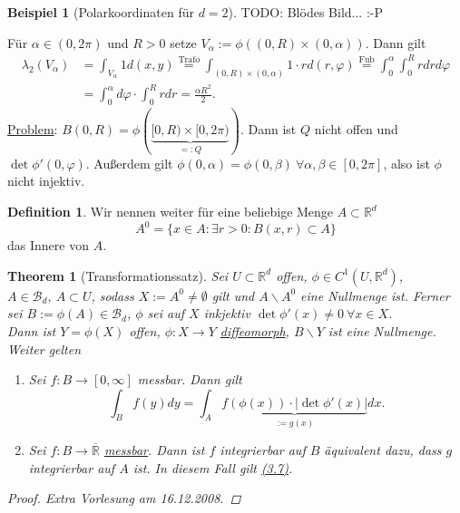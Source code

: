 \documentclass[a4paper]{report}
\newcommand{\R}{\mathbb{R}}
\newcommand{\Rq}{\overline{\R}}
\newcommand{\Borel}{\mathcal{B}}
\newcommand{\Bd}{\Borel_d}
\newcommand{\jlabel}[1]{\label{j_#1}}
\newcommand{\jhyperref}[2]{\hyperref[j_#1]{#2}}
\newcommand{\jlink}[1]{\jhyperref{#1}{#1}}
\newcommand{\jabb}[3]{ #1: #2 \rightarrow #3 }
\newcommand{\jshortlinkFubini}{\jhyperref{Fubini}{\text{Fub}}}
\newcommand{\jspace}{\vspace{8pt}}
\theoremstyle{plain}
\newtheorem{thm}{Theorem}[chapter]
\theoremstyle{definition}
\newtheorem*{defn*}{Definition}
\newtheorem*{expl*}{Beispiel}
\begin{document}
{{{{\begin{expl*}[Polarkoordinaten für $d=2$]
    \jspace
    
    TODO: Blödes Bild... :-P
    
    \jspace
    
    Für $\alpha \in (0, 2\pi)$ und $R>0$ setze $V_\alpha:= \phi((0,R)\times (0, \alpha))$. Dann gilt
    \begin{displaymath}
        \begin{split}
            \lambda_2(V_\alpha) &= \int_{V_\alpha} 1 d(x,y) \overset{\text{Trafo}}{=} \int_{(0,R)\times(0,\alpha)} 1\cdot r d(r,\varphi) \overset{\jshortlinkFubini}{=} \int_0^\alpha \int_0^R r dr d\varphi\\
            &= \int_0^\alpha d\varphi \cdot \int_0^R r dr = \frac{\alpha R^2}{2}.
        \end{split}
    \end{displaymath}
    \uline{Problem}: $B(0,R) = \phi(\underbrace{[0,R)\times [0,2\pi)}_{=: Q})$. Dann ist $Q$ nicht offen und $\det \phi'(0,\varphi)$. Außerdem gilt $\phi(0,\alpha) = \phi(0, \beta) \ \forall \alpha, \beta \in [0,2\pi]$, also ist $\phi$ nicht injektiv.
\end{expl*}

\begin{defn*}
    Wir nennen weiter für eine beliebige Menge $A\subset \R^d$ 
    \begin{displaymath}
        A^0 = \{x\in A : \exists r>0: B(x,r) \subset A\}
    \end{displaymath}
    das Innere von $A$.
\end{defn*}

\begin{thm}[Transformationssatz]
    \jlabel{Thm 3.30}
    \jlabel{Trafo}
    Sei $U\subset \R^d$ offen, $\phi \in C^1(U, \R^d)$, $A\in \Bd, \ A\subset U$, sodass $X:= A^0 \ne \emptyset$ gilt und $A\backslash A^0$ eine Nullmenge ist. Ferner sei $B:=\phi(A)\in \Bd$, $\phi$ sei auf $X$ inkjektiv $\det \phi'(x) \ne 0 \ \forall x\in X$.\\
    Dann ist $Y = \phi(X)$ offen, $\jabb{\phi}{X}{Y}$ \jlink{diffeomorph}, $B\backslash Y$ ist eine Nullmenge. Weiter gelten
    \begin{enumerate}
        \item
            Sei $\jabb{f}{B}{[0,\infty]}$ messbar. Dann gilt
            \begin{equation}
                \jlabel{(3.7)}
                \int_B f(y) dy = \int_A \underbrace{f(\phi(x))\cdot |\det \phi'(x)|}_{:= g(x)} dx.
            \end{equation}
        \item
            Sei $\jabb{f}{B}{\Rq}$ \jlink{messbar}. Dann ist $f$ integrierbar auf $B$ äquivalent dazu, dass $g$ integrierbar auf $A$ ist. In diesem Fall gilt \jlink{(3.7)}.
    \end{enumerate}
    \begin{proof}
        Extra Vorlesung am 16.12.2008.
    \end{proof}
\end{thm}

}}}}
\end{document}
